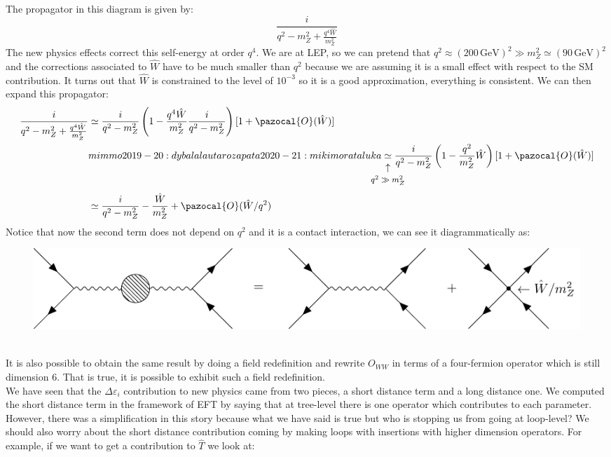 \documentclass[../main.tex]{subfiles}
\begin{document}
The propagator in this diagram is given by:
\[
\frac{i}{q^2-m_Z^2+\frac{q^4\hat{W}}{m_Z^2}}
\]
The new physics effects correct this self-energy at order $q^4$. We are at LEP, so we can pretend that $q^2\approx(200\,\text{GeV})^2\gg m_Z^2\simeq(90\,\text{GeV})^2$ and the corrections associated to $\hat{W}$ have to be much smaller than $q^2$ because we are assuming it is a small effect with respect to the SM contribution. It turns out that $\hat{W}$ is constrained to the level of $10^{-3}$ so it is a good approximation, everything is consistent. We can then expand this propagator:
\begin{align*}
\frac{i}{q^2-m_Z^2+\frac{q^4\hat{W}}{m_Z^2}}&\simeq\frac{i}{q^2-m_Z^2}\left(1-\frac{q^4\hat{W}}{m_Z^2}\frac{i}{q^2-m_Z^2}\right)[1+\pazocal{O}(\hat{W})]\\
& mimmo 
2019-20: dybala lautaro zapata
2020-21: miki morata luka\underset{\mathclap{\tikz \node {$\uparrow$} node [below=1ex] {\footnotesize $q^2\gg m_Z^2$ };}}{\simeq}\frac{i}{q^2-m_Z^2}\left(1-\frac{q^2}{m_Z^2}\hat{W}\right)[1+\pazocal{O}(\hat{W})]\\
&\simeq\frac{i}{q^2-m_Z^2}-\frac{\hat{W}}{m_Z^2}+\pazocal{O}(\hat{W}/q^2)
\end{align*}
Notice that now the second term does not depend on $q^2$ and it is a contact interaction, we can see it diagrammatically as:
\begin{figure}[h]
    \centering
    \includegraphics{Images/contact.pdf}
    \caption*{}
\end{figure}\\
It is also possible to obtain the same result by doing a field redefinition and rewrite $O_{WW}$ in terms of a four-fermion operator which is still dimension 6. That is true, it is possible to exhibit such a field redefinition.\\
We have seen that the $\Delta\varepsilon_i$ contribution to new physics came from two pieces, a short distance term and a long distance one. We computed the short distance term in the framework of EFT by saying that at tree-level there is one operator which contributes to each parameter. However, there was a simplification in this story because what we have said is true but who is stopping us from going at loop-level? We should also worry about the short distance contribution coming by making loops with insertions with higher dimension operators. For example, if we want to get a contribution to $\hat{T}$ we look at:
\end{document}
